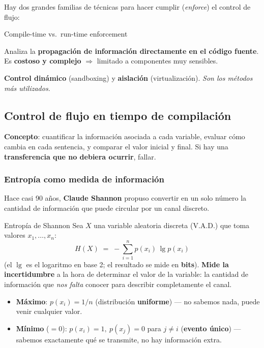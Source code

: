 \documentclass[11pt,a4paper]{article}
\newcommand{\Hentro}{H}
\begin{document}
Hay dos grandes familias de técnicas para hacer cumplir (\emph{enforce}) el control de flujo:

\begin{defbox}{Compile-time vs.\ run-time enforcement}
\begin{description}[leftmargin=2.2em,style=nextline,itemsep=3pt]
  \item[Tiempo de compilación] Analiza la \textbf{propagación de información directamente en el
        código fuente}. Es \textbf{costoso y complejo} $\Rightarrow$ limitado a componentes muy
        sensibles.
  \item[Tiempo de ejecución] \textbf{Control dinámico} (sandboxing) y \textbf{aislación}
        (virtualización). \emph{Son los métodos más utilizados.}
\end{description}
\end{defbox}

\subsection{Control de flujo en tiempo de compilación}

\textbf{Concepto}: cuantificar la información asociada a cada variable, evaluar cómo cambia en
cada sentencia, y comparar el valor inicial y final. Si hay una \textbf{transferencia que no
debiera ocurrir}, fallar.

\subsubsection{Entropía como medida de información}
Hace casi 90 años, \textbf{Claude Shannon} propuso convertir en un solo número la cantidad de
información que puede circular por un canal discreto.

\begin{defbox}{Entropía de Shannon}
Sea $X$ una variable aleatoria discreta (V.A.D.) que toma valores $x_1,\dots,x_n$:
\[
  \Hentro(X) \;=\; -\sum_{i=1}^{n} p(x_i)\,\lg p(x_i)
\]
(el $\lg$ es el logaritmo en base 2; el resultado se mide en \textbf{bits}).
\textbf{Mide la incertidumbre} a la hora de determinar el valor de la variable: la cantidad de
información que \emph{nos falta} conocer para describir completamente el canal.
\begin{itemize}[leftmargin=1.4em,itemsep=1pt]
  \item \textbf{Máximo}: $p(x_i)=1/n$ (distribución \textbf{uniforme}) — no sabemos nada, puede
        venir cualquier valor.
  \item \textbf{Mínimo} ($=0$): $p(x_i)=1,\ p(x_j)=0$ para $j\neq i$ (\textbf{evento único}) —
        sabemos exactamente qué se transmite, no hay información extra.
\end{itemize}
\end{defbox}
\end{document}
